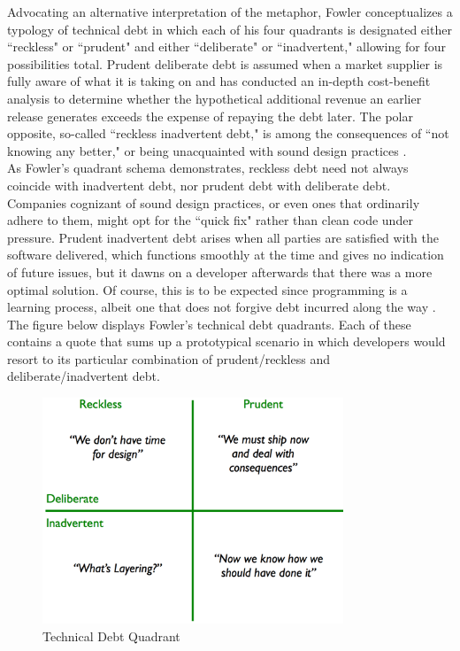 Advocating an alternative interpretation of the metaphor, Fowler \cite{fowler} conceptualizes a typology of technical debt in which each of his four quadrants is designated either ``reckless" or ``prudent" and either ``deliberate" or ``inadvertent," allowing for four possibilities total. Prudent deliberate debt is assumed when a market supplier is fully aware of what it is taking on and has conducted an in-depth cost-benefit analysis to determine whether the hypothetical additional revenue an earlier release generates exceeds the expense of repaying the debt later. The polar opposite, so-called ``reckless inadvertent debt," is among the consequences of ``not knowing any better," or being unacquainted with sound design practices \cite{fowler}.\\
As Fowler's quadrant schema demonstrates, reckless debt need not always coincide with inadvertent debt, nor prudent debt with deliberate debt. Companies cognizant of sound design practices, or even ones that ordinarily adhere to them, might opt for the ``quick fix" rather than clean code under pressure. Prudent inadvertent debt arises when all parties are satisfied with the software delivered, which functions smoothly at the time and gives no indication of future issues, but it dawns on a developer afterwards that there was a more optimal solution. Of course, this is to be expected since programming is a learning process, albeit one that does not forgive debt incurred along the way \cite{fowler}.\\
The figure below displays Fowler's technical debt quadrants. Each of these contains a quote that sums up a prototypical scenario in which developers would resort to its particular combination of prudent/reckless and deliberate/inadvertent debt.\\

\begin{figure}[h]
	\centering
	\includegraphics[width=90mm]{figures/chapter2/technicalDebtQuadrant}
	\caption{Technical Debt Quadrant}
	\label{fig:technical_debt_quadrant}
\end{figure}

